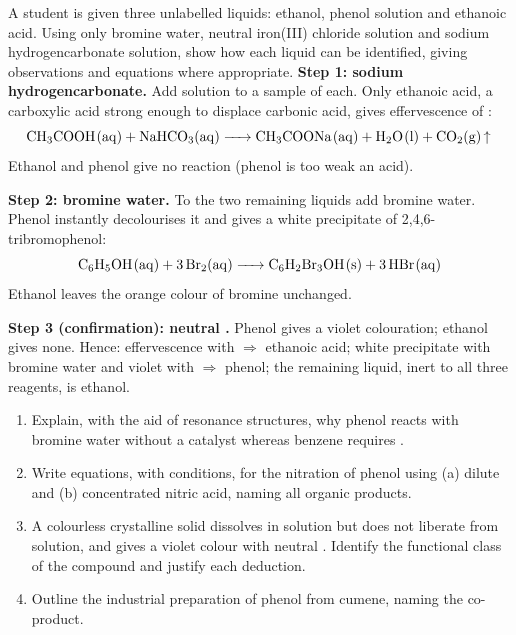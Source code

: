 \documentclass[11pt]{article}
\begin{document}
\begin{exoresolu}
A student is given three unlabelled liquids: ethanol, phenol solution and ethanoic acid. Using only bromine water, neutral iron(III) chloride solution and sodium hydrogencarbonate solution, show how each liquid can be identified, giving observations and equations where appropriate.
\tcblower
\textbf{Step 1: sodium hydrogencarbonate.} Add  solution to a sample of each. Only ethanoic acid, a carboxylic acid strong enough to displace carbonic acid, gives effervescence of :
\[
\ce{CH3COOH(aq) + NaHCO3(aq) -> CH3COONa(aq) + H2O(l) + CO2(g) ^}
\]
Ethanol and phenol give no reaction (phenol is too weak an acid).

\textbf{Step 2: bromine water.} To the two remaining liquids add bromine water. Phenol instantly decolourises it and gives a white precipitate of 2,4,6-tribromophenol:
\[
\ce{C6H5OH(aq) + 3Br2(aq) -> C6H2Br3OH(s) + 3HBr(aq)}
\]
Ethanol leaves the orange colour of bromine unchanged.

\textbf{Step 3 (confirmation): neutral .} Phenol gives a violet colouration; ethanol gives none. Hence: effervescence with  $\Rightarrow$ ethanoic acid; white precipitate with bromine water and violet with  $\Rightarrow$ phenol; the remaining liquid, inert to all three reagents, is ethanol.
\end{exoresolu}

\begin{exercice}[Consolidation]
\begin{enumerate}
\item Explain, with the aid of resonance structures, why phenol reacts with bromine water without a catalyst whereas benzene requires .
\item Write equations, with conditions, for the nitration of phenol using (a) dilute and (b) concentrated nitric acid, naming all organic products.
\item A colourless crystalline solid dissolves in  solution but does not liberate  from  solution, and gives a violet colour with neutral . Identify the functional class of the compound and justify each deduction.
\item Outline the industrial preparation of phenol from cumene, naming the co-product.
\end{enumerate}
\end{exercice}
\end{document}
